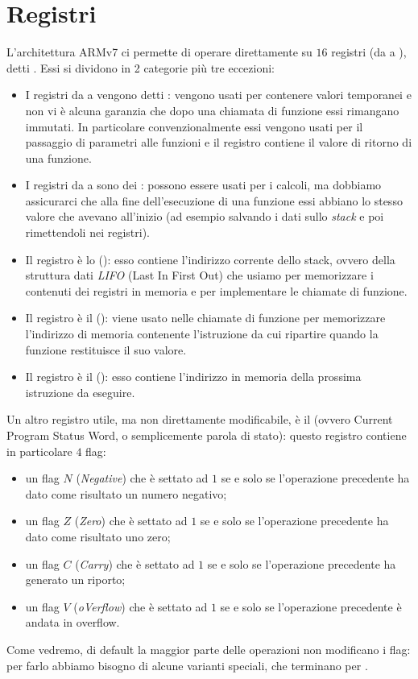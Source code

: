 \section{Registri}

L'architettura ARMv7 ci permette di operare direttamente su $16$ registri (da  a ), detti . Essi si dividono in 2 categorie più tre eccezioni:
\begin{itemize}
    \item I registri da  a  vengono detti : vengono usati per contenere valori temporanei e non vi è alcuna garanzia che dopo una chiamata di funzione essi rimangano immutati. In particolare convenzionalmente essi vengono usati per il passaggio di parametri alle funzioni e il registro  contiene il valore di ritorno di una funzione.
    \item I registri da  a  sono dei : possono essere usati per i calcoli, ma dobbiamo assicurarci che alla fine dell'esecuzione di una funzione essi abbiano lo stesso valore che avevano all'inizio (ad esempio salvando i dati sullo \emph{stack} e poi rimettendoli nei registri).
    \item Il registro  è lo  (): esso contiene l'indirizzo corrente dello stack, ovvero della struttura dati \emph{LIFO} (Last In First Out) che usiamo per memorizzare i contenuti dei registri in memoria e per implementare le chiamate di funzione.
    \item Il registro  è il  (): viene usato nelle chiamate di funzione per memorizzare l'indirizzo di memoria contenente l'istruzione da cui ripartire quando la funzione restituisce il suo valore.
    \item Il registro  è il  (): esso contiene l'indirizzo in memoria della prossima istruzione da eseguire.
\end{itemize}

Un altro registro utile, ma non direttamente modificabile, è il  (ovvero Current Program Status Word, o semplicemente parola di stato): questo registro contiene in particolare $4$ flag:
\begin{itemize}
    \item un flag $N$ (\emph{Negative}) che è settato ad $1$ se e solo se l'operazione precedente ha dato come risultato un numero negativo;
    \item un flag $Z$ (\emph{Zero}) che è settato ad $1$ se e solo se l'operazione precedente ha dato come risultato uno zero;
    \item un flag $C$ (\emph{Carry}) che è settato ad $1$ se e solo se l'operazione precedente ha generato un riporto;
    \item un flag $V$ (\emph{oVerflow}) che è settato ad $1$ se e solo se l'operazione precedente è andata in overflow.
\end{itemize}
Come vedremo, di default la maggior parte delle operazioni non modificano i flag: per farlo abbiamo bisogno di alcune varianti speciali, che terminano per .